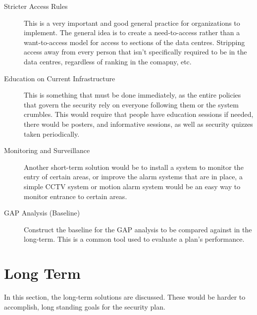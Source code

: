 \documentclass{article}
\numberwithin{equation}{section} %
\numberwithin{figure}{section} %
\numberwithin{table}{section} %
\begin{document}
\begin{description}
	\item[Stricter Access Rules]  This is a very important and good general practice for organizations to implement.  The general idea is to create a need-to-access rather than a want-to-access model for access to sections of the data centres.  Stripping access away from every person that isn't specifically required to be in the data centres, regardless of ranking in the comapny, etc. 
	\item[Education on Current Infrastructure]  This is something that must be done immediately, as the entire policies that govern the security rely on everyone following them or the system crumbles.  This would require that people have education sessions if needed, there would be posters, and informative sessions, as well as security quizzes taken periodically.  
	\item[Monitoring and Surveillance]  Another short-term solution would be to install a system to monitor the entry of certain areas, or improve the alarm systems that are in place, a simple CCTV system or motion alarm system would be an easy way to monitor entrance to certain areas.
	\item[GAP Analysis (Baseline)]  Construct the baseline for the GAP analysis to be compared against in the long-term.  This is a common tool used to evaluate a plan's performance.  
\end{description}

\section{Long Term}
\label{sec:long}
In this section, the long-term solutions are discussed.  These would be harder to accomplish, long standing goals for the security plan.
\end{document}
